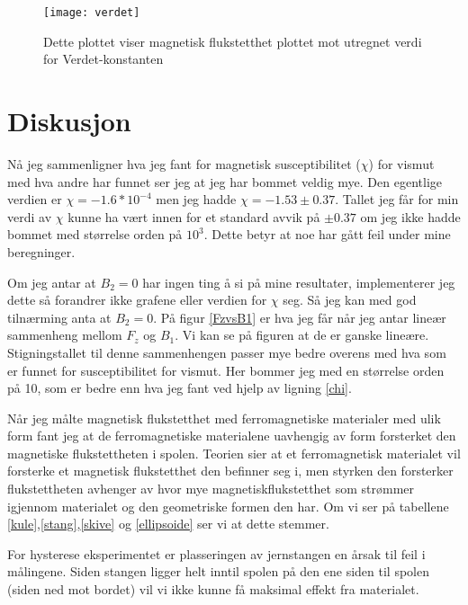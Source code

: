 \documentclass[norsk,a4paper,12pt]{article}
\begin{document}
 \begin{figure}
	\begin{center}
  	\texttt{[image: verdet]}\\
	\caption[Verdet-konstant]{Dette plottet viser magnetisk flukstetthet plottet mot utregnet verdi for Verdet-konstanten}
	\label{verdet}
	\end{center}
\end{figure}




\newpage
\section{Diskusjon}
Nå jeg sammenligner hva jeg fant for magnetisk susceptibilitet ($\chi$) for vismut med hva andre har funnet ser jeg at jeg har bommet veldig mye. Den egentlige verdien er $\chi = -1.6*10^{-4}$ men jeg hadde $\chi = -1.53 \pm 0.37$. Tallet jeg får for min verdi av $\chi$ kunne ha vært innen for et standard avvik på $\pm 0.37$ om jeg ikke hadde bommet med størrelse orden på $10^3$. Dette betyr at noe har gått feil under mine beregninger. 

Om jeg antar at $B_2=0$ har ingen ting å si på mine resultater, implementerer jeg dette så forandrer ikke grafene eller verdien for $\chi$ seg. Så jeg kan med god tilnærming anta at $B_2 = 0$. På figur \vref{FzvsB1} er hva jeg får når jeg antar lineær sammenheng mellom $F_z$ og $B_1$. Vi kan se på figuren at de er ganske lineære. Stigningstallet til denne sammenhengen passer mye bedre overens med hva som er funnet for susceptibilitet for vismut. Her bommer jeg med en størrelse orden på 10, som er bedre enn hva jeg fant ved hjelp av ligning \vref{chi}. 

Når jeg målte magnetisk flukstetthet med ferromagnetiske materialer med ulik form fant jeg at de ferromagnetiske materialene uavhengig av form forsterket den magnetiske flukstettheten i spolen. Teorien sier at et ferromagnetisk materialet vil forsterke et magnetisk flukstetthet den befinner seg i, men styrken den forsterker flukstettheten avhenger av hvor mye magnetiskflukstetthet som strømmer igjennom materialet og den geometriske formen den har. Om vi ser på tabellene \ref{kule},\ref{stang},\ref{skive} og \vref{ellipsoide} ser vi at dette stemmer.


For hysterese eksperimentet er plasseringen av jernstangen en årsak til feil i målingene. Siden stangen ligger helt inntil spolen på den ene siden til spolen (siden ned mot bordet) vil vi ikke kunne få maksimal effekt fra materialet.  
\end{document}
